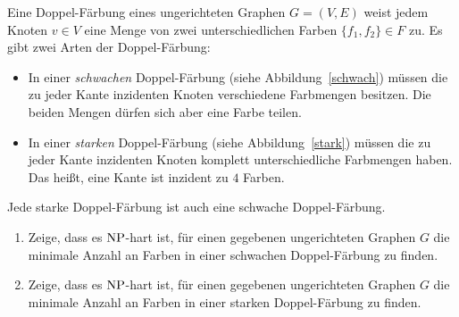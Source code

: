 \documentclass{uebung_cs}
\begin{document}
\begin{aufgabe}[Doppel-Färbung]
	Eine Doppel-Färbung eines ungerichteten Graphen $G = (V,E)$ weist jedem Knoten $v \in V$ eine Menge von zwei unterschiedlichen Farben $\{f_1,f_2\} \in F$ zu. Es gibt zwei Arten der Doppel-Färbung:
	\begin{itemize}
		\item In einer \textit{schwachen} Doppel-Färbung (siehe Abbildung~\ref{schwach}) müssen die zu jeder Kante inzidenten Knoten verschiedene Farbmengen besitzen. Die beiden Mengen dürfen sich aber eine Farbe teilen.
		\item In einer \textit{starken} Doppel-Färbung (siehe Abbildung~\ref{stark}) müssen die zu jeder Kante inzidenten Knoten komplett unterschiedliche Farbmengen haben. Das heißt, eine Kante ist inzident zu $4$ Farben.
	\end{itemize}
	Jede starke Doppel-Färbung ist auch eine schwache Doppel-Färbung.
	\begin{enumerate}
		\item Zeige, dass es $\mathrm{NP}$-hart ist, für einen gegebenen ungerichteten Graphen $G$ die minimale Anzahl an Farben in einer schwachen Doppel-Färbung zu finden.
		\item Zeige, dass es $\mathrm{NP}$-hart ist, für einen gegebenen ungerichteten Graphen $G$ die minimale Anzahl an Farben in einer starken Doppel-Färbung zu finden.
	\end{enumerate}
	\begin{figure}[ht]
	    \begin{minipage}{0.5\linewidth}
	        \centering
\end{minipage}
\end{figure}
\end{aufgabe}
\end{document}
